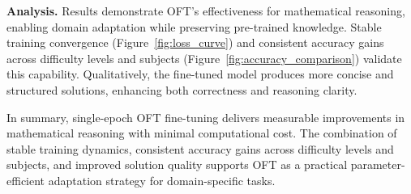 \documentclass{article}
\begin{document}
\textbf{Analysis.} 
Results demonstrate OFT's effectiveness for mathematical reasoning, enabling domain 
adaptation while preserving pre-trained knowledge. Stable training convergence 
(Figure~\ref{fig:loss_curve}) and consistent accuracy gains across difficulty levels 
and subjects (Figure~\ref{fig:accuracy_comparison}) validate this capability. 
Qualitatively, the fine-tuned model produces more concise and structured solutions, 
enhancing both correctness and reasoning clarity. 

In summary, single-epoch OFT fine-tuning delivers measurable improvements in mathematical reasoning with minimal computational cost. The combination of stable training dynamics, consistent accuracy gains across difficulty levels and subjects, and improved solution quality supports OFT as a practical parameter-efficient adaptation strategy for domain-specific tasks.

\printbibliography
 
\end{document}
